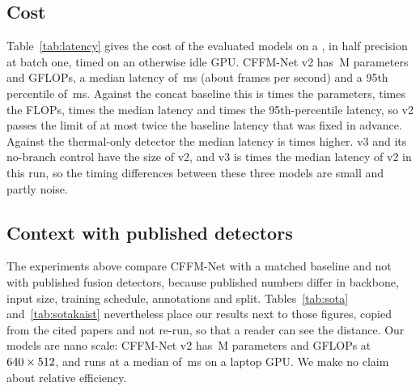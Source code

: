 \subsection{Cost}
\label{sec:cost}
Table~\ref{tab:latency} gives the cost of the evaluated models on a \latLocalDevice{}, in half precision at batch one, timed on an otherwise idle GPU. CFFM-Net v2 has \latLocalVtwoParamsM{}\,M parameters and \latLocalVtwoGflops{} GFLOPs, a median latency of \latLocalVtwoMedianMs{}\,ms (about \latLocalVtwoFps{} frames per second) and a 95th percentile of \latLocalVtwoPNinetyFiveMs{}\,ms. Against the concat baseline this is \latLocalRatioParams{} times the parameters, \latLocalRatioGflops{} times the FLOPs, \latLocalRatioMedian{} times the median latency and \latLocalRatioPNinetyFive{} times the 95th-percentile latency, so v2 passes the limit of at most twice the baseline latency that was fixed in advance. Against the thermal-only detector the median latency is \latLocalVtwoOverThmMedian{} times higher. v3 and its no-branch control have the size of v2, and v3 is \latLocalVthreeOverVtwoMedian{} times the median latency of v2 in this run, so the timing differences between these three models are small and partly noise.



\subsection{Context with published detectors}
\label{sec:sota}
The experiments above compare CFFM-Net with a matched baseline and not with published fusion detectors, because published numbers differ in backbone, input size, training schedule, annotations and split. Tables~\ref{tab:sota} and~\ref{tab:sotakaist} nevertheless place our results next to those figures, copied from the cited papers and not re-run, so that a reader can see the distance. Our models are nano scale: CFFM-Net v2 has \latLocalVtwoParamsM{}\,M parameters and \latLocalVtwoGflops{} GFLOPs at $640{}\times512{}$, and runs at a median of \latLocalVtwoMedianMs{}\,ms on a laptop GPU. We make no claim about relative efficiency.





